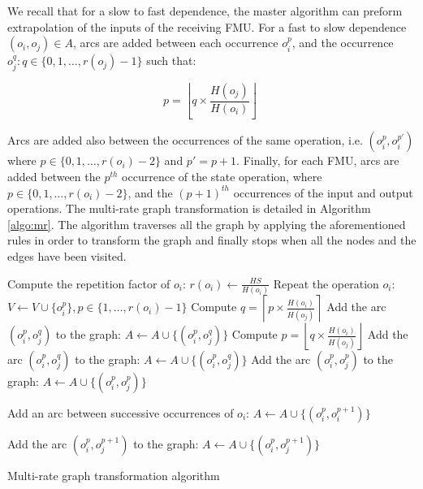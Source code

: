 We recall that for a slow to fast dependence, the master algorithm can preform extrapolation of the inputs of the receiving FMU. For a fast to slow dependence $(o_i,o_j) \in A$, arcs are added between each occurrence $o_i^p$, and the occurrence $o_j^q: q \in \{0,1, \dots ,r(o_j)-1\}$ such that:

\begin{equation}
p = \left \lfloor{q \times \frac{H(o_j)}{H(o_i)}}\right \rfloor\;
\end{equation}

Arcs are added also between the occurrences of the same operation, i.e. $(o_i^p,o_i^{p'})$ where $p \in \{0,1, \dots ,r(o_i)-2\}$ and $p' = p + 1$. Finally, for each FMU, arcs are added between the $p^{th}$ occurrence of the state operation, where $p \in \{0,1, \dots ,r(o_i)-2\}$, and the $(p+1)^{th}$ occurrences of the input and output operations. The multi-rate graph transformation is detailed in Algorithm \ref{algo:mr}. The algorithm traverses all the graph by applying the aforementioned rules in order to transform the graph and finally stops when all the nodes and the edges have been visited.

\begin{algorithm}[!htp]
		{
			Compute the repetition factor of $o_i$: $r(o_i) \leftarrow \frac{HS}{H(o_i)}$\;
			Repeat the operation $o_i$: $V \leftarrow V \cup \{o_i^p\}, p \in \{1, \dots,r(o_i)-1\}$\;
		}
		{
			{
					{
						Compute $q = \left \lceil{p \times \frac{H(o_i)}{H(o_j)}}\right \rceil$\;
						Add the arc $(o_i^p,o_j^q)$ to the graph: $A \leftarrow A \cup \{(o_i^p,o_j^q)\}$\;
					}
			}
			{
					{
						Compute $p = \left \lfloor{q \times \frac{H(o_i)}{H(o_j)}}\right \rfloor$\;
						Add the arc $(o_i^p,o_j^q)$ to the graph: $A \leftarrow A \cup \{(o_i^p,o_j^q)\}$\;
					}
			}
			\Else
			{
					{
					  Add the arc $(o_i^p,o_j^p)$ to the graph: $A \leftarrow A \cup \{(o_i^p,o_j^p)\}$\;
					}
			}
		}
		{
			{
				 Add an arc between successive occurrences of $o_i$: $A \leftarrow A \cup \{(o_i^p,o_i^{p+1})\}$\;
			}
			
		}
		{
					{
						{
							Add the arc $(o_i^p,o_j^{p+1})$ to the graph: $A \leftarrow A \cup \{(o_i^p,o_j^{p+1})\}$\;
						}
					
					}
		}
	\caption{Multi-rate graph transformation algorithm}
	\label{algo:mr}
\end{algorithm}

